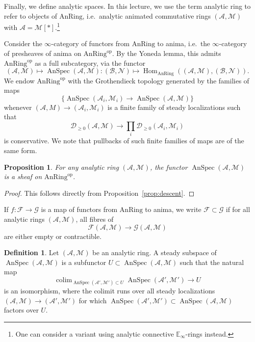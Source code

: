 \documentclass[11pt]{amsbook}
\DeclareMathOperator{\Hom}{Hom}
\newcommand{\AnRing}{{\mathrm{AnRing}}}
\DeclareMathOperator{\AnSpec}{AnSpec}
\DeclareMathOperator{\colim}{colim}
\numberwithin{equation}{section}
\numberwithin{theorem}{section}
\newtheorem{proposition}[theorem]{Proposition}
\theoremstyle{definition}
\newtheorem{definition}[theorem]{Definition}
\begin{document}
Finally, we define analytic spaces. In this lecture, we use the term analytic ring to refer to objects of $\AnRing$, i.e.~analytic animated commutative rings $(\mathcal A,\mathcal M)$ with $\mathcal A = \mathcal M[\ast]$.\footnote{One can consider a variant using analytic connective $\mathbb E_\infty$-rings instead.}

Consider the $\infty$-category of functors from $\AnRing$ to anima, i.e.~the $\infty$-category of presheaves of anima on $\AnRing^{\mathrm{op}}$. By the Yoneda lemma, this admits $\AnRing^{\mathrm{op}}$ as a full subcategory, via the functor
\[
(\mathcal A,\mathcal M)\mapsto \AnSpec(\mathcal A,\mathcal M) : (\mathcal B,\mathcal N)\mapsto \Hom_\AnRing((\mathcal A,\mathcal M),(\mathcal B,\mathcal N)).
\]
We endow $\AnRing^{\mathrm{op}}$ with the Grothendieck topology generated by the families of maps
\[
\{\AnSpec(\mathcal A_i,\mathcal M_i)\to \AnSpec(\mathcal A,\mathcal M)\}
\]
whenever $(\mathcal A,M)\to (\mathcal A_i,\mathcal M_i)$ is a finite family of steady localizations such that
\[
\mathcal D_{\geq 0}(\mathcal A,\mathcal M)\to \prod_i \mathcal D_{\geq 0}(\mathcal A_i,\mathcal M_i)
\]
is conservative. We note that pullbacks of such finite families of maps are of the same form.

\begin{proposition} For any analytic ring $(\mathcal A,\mathcal M)$, the functor $\AnSpec(\mathcal A,\mathcal M)$ is a sheaf on $\AnRing^{\mathrm{op}}$.
\end{proposition}

\begin{proof} This follows directly from Proposition~\ref{prop:descent}.
\end{proof}

If $f: \mathcal F\to \mathcal G$ is a map of functors from $\AnRing$ to anima, we write $\mathcal F\subset \mathcal G$ if for all analytic rings $(\mathcal A,\mathcal M)$, all fibres of 
\[
\mathcal F(\mathcal A,\mathcal M)\to \mathcal G(\mathcal A,\mathcal M)
\]
are either empty or contractible.

\begin{definition} Let $(\mathcal A,\mathcal M)$ be an analytic ring. A steady subspace of $\AnSpec(\mathcal A,\mathcal M)$ is a subfunctor $U\subset \AnSpec(\mathcal A,\mathcal M)$ such that the natural map
\[
\colim_{\AnSpec(\mathcal A',\mathcal M')\subset U} \AnSpec(\mathcal A',\mathcal M')\to U
\]
is an isomorphism, where the colimit runs over all steady localizations $(\mathcal A,\mathcal M)\to (\mathcal A',\mathcal M')$ for which $\AnSpec(\mathcal A',\mathcal M')\subset \AnSpec(\mathcal A,\mathcal M)$ factors over $U$.
\end{definition}
\end{document}
